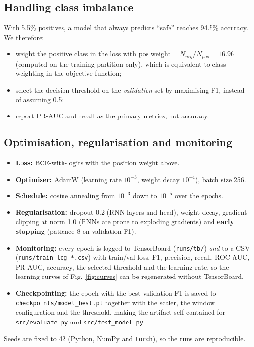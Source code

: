 \documentclass[conference]{IEEEtran}
\begin{document}
\subsection{Handling class imbalance}
With 5.5\% positives, a model that always predicts ``safe'' reaches 94.5\%
accuracy. We therefore:
\begin{itemize}
\item weight the positive class in the loss with
      $\text{pos\_weight} = N_{neg}/N_{pos} = 16.96$ (computed on the
      training partition only), which is equivalent to class weighting in the
      objective function;
\item select the decision threshold on the \emph{validation} set by maximising
      F1, instead of assuming 0.5;
\item report PR-AUC and recall as the primary metrics, not accuracy.
\end{itemize}

\subsection{Optimisation, regularisation and monitoring}
\begin{itemize}
\item \textbf{Loss:} BCE-with-logits with the position weight above.
\item \textbf{Optimiser:} AdamW (learning rate $10^{-3}$, weight decay
      $10^{-4}$), batch size 256.
\item \textbf{Schedule:} cosine annealing from $10^{-3}$ down to
      $10^{-5}$ over the epochs.
\item \textbf{Regularisation:} dropout 0.2 (RNN layers and head), weight
      decay, gradient clipping at norm 1.0 (RNNs are prone to exploding
      gradients) and \textbf{early stopping} (patience 8 on validation F1).
\item \textbf{Monitoring:} every epoch is logged to TensorBoard
      (\texttt{runs/tb/}) \emph{and} to a CSV (\texttt{runs/train\_log\_*.csv})
      with train/val loss, F1, precision, recall, ROC-AUC, PR-AUC, accuracy,
      the selected threshold and the learning rate, so the learning curves of
      Fig.~\ref{fig:curves} can be regenerated without TensorBoard.
\item \textbf{Checkpointing:} the epoch with the best validation F1 is saved
      to \texttt{checkpoints/model\_best.pt} together with the scaler, the
      window configuration and the threshold, making the artifact
      self-contained for \texttt{src/evaluate.py} and
      \texttt{src/test\_model.py}.
\end{itemize}
Seeds are fixed to 42 (Python, NumPy and \texttt{torch}), so the runs are
reproducible.
\end{document}
